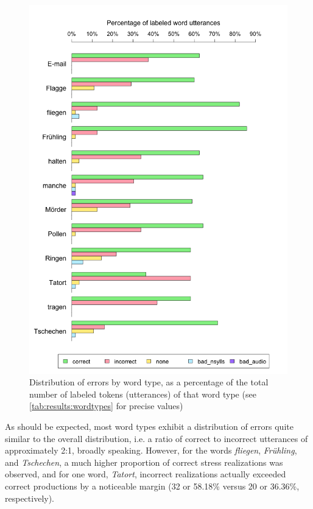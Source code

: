 			
			

			\begin{figure}[tbp]
				\centering
				\includegraphics[width=\textwidth]{img/plots/judgmentsWordTypes}
				\caption[Error distribution by word type]{Distribution of errors by word type,
				as a percentage of the total number of labeled tokens (utterances) of that word type 
				(see \cref{tab:results:wordtypes} for precise values)
				}
				\label{fig:results:wordbars}
			\end{figure}	
			
			As should be expected, most word types exhibit a distribution of errors quite similar to the overall distribution, i.e. a ratio of correct to incorrect utterances of approximately 2:1, broadly speaking. However, for the words \textit{fliegen}, \textit{Fr\"{u}hling}, and \textit{Tschechen}, a much higher proportion of correct stress realizations was observed,
			and for one word, \textit{Tatort}, incorrect realizations actually exceeded correct productions by a noticeable margin (32 or 58.18\% versus 20 or 36.36\%, respectively). 
			
